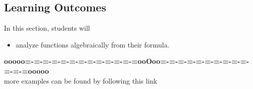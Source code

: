 \documentclass{ximera}
\begin{document}
\subsection{Learning Outcomes}


\begin{sectionOutcomes}
In this section, students will 

\begin{itemize}
\item analyze functions algebraically from their formula.
\end{itemize}
\end{sectionOutcomes}


















\begin{center}
\textbf{\textcolor{green!50!black}{ooooo=-=-=-=-=-=-=-=-=-=-=-=-=ooOoo=-=-=-=-=-=-=-=-=-=-=-=-=ooooo}} \\

more examples can be found by following this link\\ 

\end{center}
\end{document}
